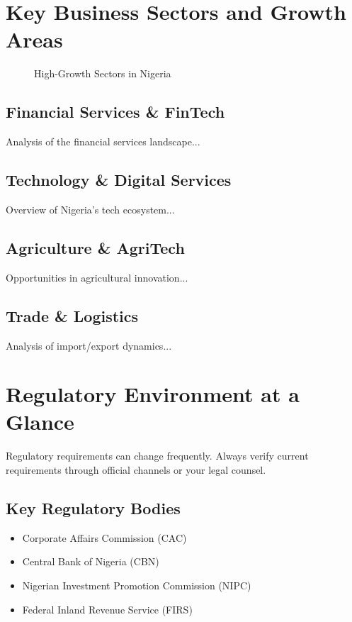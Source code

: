 \section{Key Business Sectors and Growth Areas}

\begin{figure}[h]
    \centering
    \caption{High-Growth Sectors in Nigeria}
\end{figure}

\subsection{Financial Services \& FinTech}
Analysis of the financial services landscape...

\subsection{Technology \& Digital Services}
Overview of Nigeria's tech ecosystem...

\subsection{Agriculture \& AgriTech}
Opportunities in agricultural innovation...

\subsection{Trade \& Logistics}
Analysis of import/export dynamics...

\section{Regulatory Environment at a Glance}

\begin{warningbox}
Regulatory requirements can change frequently. Always verify current requirements through official channels or your legal counsel.
\end{warningbox}

\subsection{Key Regulatory Bodies}
\begin{itemize}
    \item Corporate Affairs Commission (CAC)
    \item Central Bank of Nigeria (CBN)
    \item Nigerian Investment Promotion Commission (NIPC)
    \item Federal Inland Revenue Service (FIRS)
\end{itemize}


